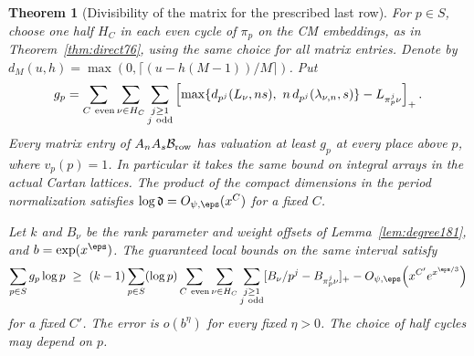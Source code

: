\documentclass[a4paper,11pt]{article}
\newtheorem{theorem}[proposition]{Theorem}
\theoremstyle{definition}
\theoremstyle{remark}
\numberwithin{equation}{section}
\begin{document}
\begin{theorem}[Divisibility of the matrix for the prescribed last row]
\label{thm:frob244}
For \(p\in S\), choose one half \(H_C\) in each even cycle of
\(\pi_p\) on the CM embeddings, as in Theorem~\ref{thm:direct76},
using the same choice for all matrix entries. Denote by
\(d_M(u,h)=\max(0,\lceil(u-h(M-1))/M\rceil)\). Put
\[
 g_p=\sum_{C\ {\rm even}}\sum_{\nu\in H_C}
          \sum_{\substack{j\ge1\\j\ {\rm odd}}}
 \left[
   \max\{d_{p^j}(L_\nu,ns),\
           n\,d_{p^j}(\lambda_{\nu,n},s)\}
                   -L_{\pi_p^j\nu}
 \right]_+ .
\]
Every matrix entry of \(A_nA_s\mathcal B_{\rm row}\) has valuation at least
\(g_p\) at every place above \(p\), where \(v_p(p)=1\). In
particular it takes the same bound on integral arrays in the
actual Cartan lattices. The product of the compact dimensions in
the period normalization satisfies \(\log\mathfrak d=O_{\psi,\eps}(x^C)\)
for a fixed \(C\).

Let \(k\) and \(B_\nu\) be the rank parameter and weight offsets
of Lemma~\ref{lem:degree181}, and \(b=\exp(x^\eps)\).
The guaranteed local bounds on the same interval satisfy
\[
 \sum_{p\in S}g_p\log p\ \ge\
  (k-1)\sum_{p\in S}(\log p)\sum_{C\ {\rm even}}\sum_{\nu\in H_C}
       \sum_{\substack{j\ge1\\j\ {\rm odd}}}
       [B_\nu/p^j-B_{\pi_p^j\nu}]_+
       -O_{\psi,\eps}\!\left(x^{C'}e^{x^{\eps/3}}\right)
\]
for a fixed \(C'\). The error is \(o(b^\eta)\) for every fixed
\(\eta>0\). The choice of half cycles may depend on \(p\).
\end{theorem}
\end{document}
